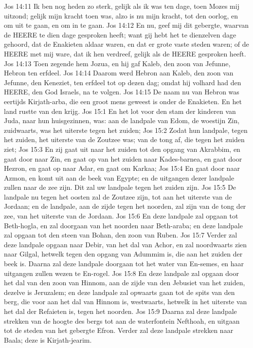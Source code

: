 Jos 14:11  Ik ben nog heden zo sterk, gelijk als ik was ten dage, toen Mozes mij uitzond; gelijk mijn kracht toen was, alzo is nu mijn kracht, tot den oorlog, en om uit te gaan, en om in te gaan.
Jos 14:12  En nu, geef mij dit gebergte, waarvan de HEERE te dien dage gesproken heeft; want gij hebt het te dienzelven dage gehoord, dat de Enakieten aldaar waren, en dat er grote vaste steden waren; of de HEERE met mij ware, dat ik hen verdreef, gelijk als de HEERE gesproken heeft.
Jos 14:13  Toen zegende hem Jozua, en hij gaf Kaleb, den zoon van Jefunne, Hebron ten erfdeel.
Jos 14:14  Daarom werd Hebron aan Kaleb, den zoon van Jefunne, den Keneziet, ten erfdeel tot op dezen dag; omdat hij volhard had den HEERE, den God Israels, na te volgen.
Jos 14:15  De naam nu van Hebron was eertijds Kirjath-arba, die een groot mens geweest is onder de Enakieten. En het land rustte van den krijg.
Jos 15:1  En het lot voor den stam der kinderen van Juda, naar hun huisgezinnen, was: aan de landpale van Edom, de woestijn Zin, zuidwaarts, was het uiterste tegen het zuiden;
Jos 15:2  Zodat hun landpale, tegen het zuiden, het uiterste van de Zoutzee was; van de tong af, die tegen het zuiden ziet;
Jos 15:3  En zij gaat uit naar het zuiden tot den opgang van Akrabbim, en gaat door naar Zin, en gaat op van het zuiden naar Kades-barnea, en gaat door Hezron, en gaat op naar Adar, en gaat om Karkaa;
Jos 15:4  En gaat door naar Azmon, en komt uit aan de beek van Egypte; en de uitgangen dezer landpale zullen naar de zee zijn. Dit zal uw landpale tegen het zuiden zijn.
Jos 15:5  De landpale nu tegen het oosten zal de Zoutzee zijn, tot aan het uiterste van de Jordaan; en de landpale, aan de zijde tegen het noorden, zal zijn van de tong der zee, van het uiterste van de Jordaan.
Jos 15:6  En deze landpale zal opgaan tot Beth-hogla, en zal doorgaan van het noorden naar Beth-araba; en deze landpale zal opgaan tot den steen van Bohan, den zoon van Ruben.
Jos 15:7  Verder zal deze landpale opgaan naar Debir, van het dal van Achor, en zal noordwaarts zien naar Gilgal, hetwelk tegen den opgang van Adummim is, die aan het zuiden der beek is. Daarna zal deze landpale doorgaan tot het water van En-semes, en haar uitgangen zullen wezen te En-rogel.
Jos 15:8  En deze landpale zal opgaan door het dal van den zoon van Hinnom, aan de zijde van den Jebusiet van het zuiden, dezelve is Jeruzalem; en deze landpale zal opwaarts gaan tot de spits van den berg, die voor aan het dal van Hinnom is, westwaarts, hetwelk in het uiterste van het dal der Refaieten is, tegen het noorden.
Jos 15:9  Daarna zal deze landpale strekken van de hoogte des bergs tot aan de waterfontein Nefthoah, en uitgaan tot de steden van het gebergte Efron. Verder zal deze landpale strekken naar Baala; deze is Kirjath-jearim.
